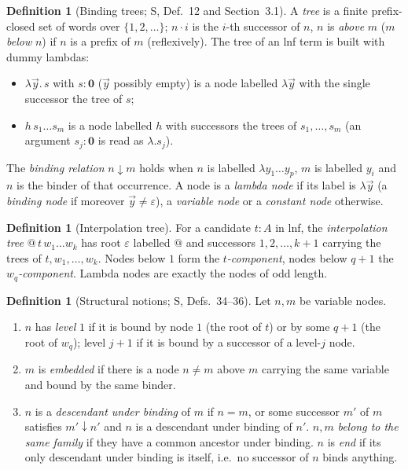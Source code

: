\documentclass[11pt]{article}
\newcommand{\Ground}{\mathbf{0}}
\newcommand{\bnd}{\mathrel{\downarrow}}
\newcommand{\suc}[2]{#1{\cdot}#2}
\theoremstyle{plain}
\theoremstyle{definition}
\newtheorem{definition}[theorem]{Definition}
\theoremstyle{remark}
\begin{document}
\begin{definition}[Binding trees; S, Def.~12 and Section~3.1]
A \emph{tree} is a finite prefix-closed set of words over
$\{1,2,\dots\}$; $\suc ni$ is the $i$-th successor of $n$, $n$ is
\emph{above} $m$ ($m$ \emph{below} $n$) if $n$ is a prefix of $m$
(reflexively).  The tree of an lnf term is built with dummy lambdas:
\begin{itemize}
\item $\lambda\vec y.\,s$ with $s:\Ground$ ($\vec y$ possibly empty) is a
  node labelled $\lambda\vec y$ with the single successor the tree of
  $s$;
\item $h\,s_1\dots s_m$ is a node labelled $h$ with successors the trees
  of $s_1,\dots,s_m$ (an argument $s_j:\Ground$ is read as $\lambda.s_j$).
\end{itemize}
The \emph{binding relation} $n\bnd m$ holds when $n$ is labelled
$\lambda y_1\dots y_p$, $m$ is labelled $y_i$ and $n$ is the binder of
that occurrence.  A node is a \emph{lambda node} if its label is
$\lambda\vec y$ (a \emph{binding node} if moreover $\vec y\neq\varepsilon$),
a \emph{variable node} or a \emph{constant node} otherwise.
\end{definition}

\begin{definition}[Interpolation tree]
For a candidate $t:A$ in lnf, the \emph{interpolation tree}
$@\,t\,w_1\dots w_k$ has root $\varepsilon$ labelled $@$ and successors
$1,2,\dots,k+1$ carrying the trees of $t,w_1,\dots,w_k$.  Nodes below $1$
form the \emph{$t$-component}, nodes below $q+1$ the
\emph{$w_q$-component}.  Lambda nodes are exactly the nodes of odd
length.
\end{definition}

\begin{definition}[Structural notions; S, Defs.~34--36]\label{def:struct}
Let $n,m$ be variable nodes.
\begin{enumerate}
\item $n$ has \emph{level} $1$ if it is bound by node $1$ (the root of
  $t$) or by some $q+1$ (the root of $w_q$); level $j+1$ if it is bound
  by a successor of a level-$j$ node.
\item $m$ is \emph{embedded} if there is a node $n\neq m$ above $m$
  carrying the same variable and bound by the same binder.
\item $n$ is a \emph{descendant under binding} of $m$ if $n=m$, or some
  successor $m'$ of $m$ satisfies $m'\bnd n'$ and $n$ is a descendant
  under binding of $n'$.  $n,m$ \emph{belong to the same family} if
  they have a common ancestor under binding.  $n$ is \emph{end} if its
  only descendant under binding is itself, i.e.\ no successor of $n$
  binds anything.
\end{enumerate}
\end{definition}
\end{document}
